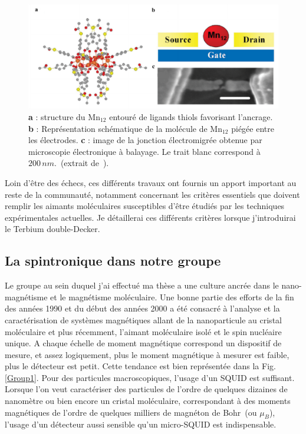 \begin{figure}
\centering \includegraphics[scale=0.45]{Spintronique/MolSpintro/MolSpintro.pdf}
\caption{\textbf{a} : structure du Mn$_{12}$ entouré de ligands thiols favorisant l'ancrage. \textbf{b} : Représentation schématique de la molécule de Mn$_{12}$ piégée entre les électrodes. \textbf{c} : image de la jonction électromigrée obtenue par microscopie électronique à balayage. Le trait blanc correspond à $200\,nm$.~(extrait de~\cite{Heersche2006}).}
\label{MolSpintro}
\end{figure}

Loin d'\^etre des échecs, ces différents travaux ont fournis un apport important au reste de la communauté, notamment concernant les critères essentiels que doivent remplir les aimants moléculaires susceptibles d'être étudiés par les techniques expérimentales actuelles. Je détaillerai ces différents critères lorsque j'introduirai le Terbium double-Decker.
 
\subsection{La spintronique dans notre groupe}
Le groupe au sein duquel j'ai effectué ma thèse a une culture ancrée dans le nano-magnétisme et le magnétisme moléculaire. Une bonne partie des efforts de la fin des années 1990 et du début des années 2000 a été consacré à l'analyse et la caractérisation de systèmes magnétiques allant de la nanoparticule au cristal moléculaire  et plus récemment, l'aimant moléculaire isolé et le spin nucléaire unique. A chaque échelle de moment magnétique correspond un dispositif de mesure, et assez logiquement, plus le moment magnétique à mesurer est faible, plus le détecteur est petit. Cette tendance est bien représentée dans la Fig.\ref{Group1}. Pour des particules macroscopiques, l'usage d'un SQUID est suffisant. Lorsque l'on veut caractériser des particules de l'ordre de quelques dizaines de nanomètre ou bien encore un cristal moléculaire, correspondant à des moments magnétiques de l'ordre de quelques milliers de magnéton de Bohr~(ou $\mu_B$), l'usage d'un détecteur aussi sensible qu'un micro-SQUID est indispensable.


